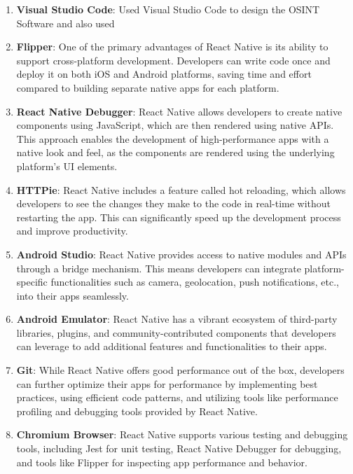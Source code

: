 \begin{enumerate}
  \item \textbf{Visual Studio Code}: Used Visual Studio Code to design the OSINT Software and also used 
  
  \item \textbf{Flipper}: One of the primary advantages of React Native is its ability to support cross-platform development. Developers can write code once and deploy it on both iOS and Android platforms, saving time and effort compared to building separate native apps for each platform.
  
  \item \textbf{React Native Debugger}: React Native allows developers to create native components using JavaScript, which are then rendered using native APIs. This approach enables the development of high-performance apps with a native look and feel, as the components are rendered using the underlying platform's UI elements.
  
  \item \textbf{HTTPie}: React Native includes a feature called hot reloading, which allows developers to see the changes they make to the code in real-time without restarting the app. This can significantly speed up the development process and improve productivity.
  
  \item \textbf{Android Studio}: React Native provides access to native modules and APIs through a bridge mechanism. This means developers can integrate platform-specific functionalities such as camera, geolocation, push notifications, etc., into their apps seamlessly.
  
  \item \textbf{Android Emulator}: React Native has a vibrant ecosystem of third-party libraries, plugins, and community-contributed components that developers can leverage to add additional features and functionalities to their apps.
  
  \item \textbf{Git}: While React Native offers good performance out of the box, developers can further optimize their apps for performance by implementing best practices, using efficient code patterns, and utilizing tools like performance profiling and debugging tools provided by React Native.
  
  \item \textbf{Chromium Browser}: React Native supports various testing and debugging tools, including Jest for unit testing, React Native Debugger for debugging, and tools like Flipper for inspecting app performance and behavior. 


\end{enumerate}
